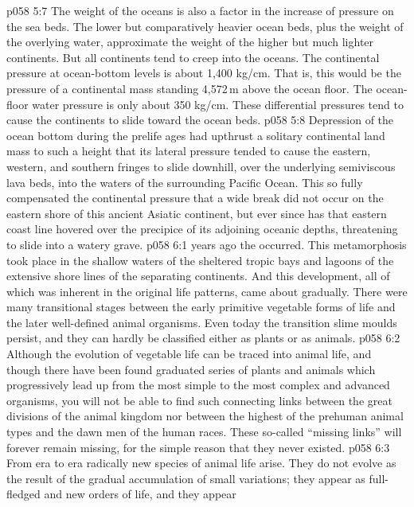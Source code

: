 \vs p058 5:7 The weight of the oceans is also a factor in the increase of pressure on the sea beds. The lower but comparatively heavier ocean beds, plus the weight of the overlying water, approximate the weight of the higher but much lighter continents. But all continents tend to creep into the oceans. The continental pressure at ocean\hyp{}bottom levels is about 1,400 kg/cm. That is, this would be the pressure of a continental mass standing 4,572\,m above the ocean floor. The ocean\hyp{}floor water pressure is only about 350 kg/cm. These differential pressures tend to cause the continents to slide toward the ocean beds.
\vs p058 5:8 Depression of the ocean bottom during the prelife ages had upthrust a solitary continental land mass to such a height that its lateral pressure tended to cause the eastern, western, and southern fringes to slide downhill, over the underlying semiviscous lava beds, into the waters of the surrounding Pacific Ocean. This so fully compensated the continental pressure that a wide break did not occur on the eastern shore of this ancient Asiatic continent, but ever since has that eastern coast line hovered over the precipice of its adjoining oceanic depths, threatening to slide into a watery grave.
\vs p058 6:1  years ago the  occurred. This metamorphosis took place in the shallow waters of the sheltered tropic bays and lagoons of the extensive shore lines of the separating continents. And this development, all of which was inherent in the original life patterns, came about gradually. There were many transitional stages between the early primitive vegetable forms of life and the later well\hyp{}defined animal organisms. Even today the transition slime moulds persist, and they can hardly be classified either as plants or as animals.
\vs p058 6:2 \pc Although the evolution of vegetable life can be traced into animal life, and though there have been found graduated series of plants and animals which progressively lead up from the most simple to the most complex and advanced organisms, you will not be able to find such connecting links between the great divisions of the animal kingdom nor between the highest of the prehuman animal types and the dawn men of the human races. These so\hyp{}called “missing links” will forever remain missing, for the simple reason that they never existed.
\vs p058 6:3 From era to era radically new species of animal life arise. They do not evolve as the result of the gradual accumulation of small variations; they appear as full\hyp{}fledged and new orders of life, and they appear 
